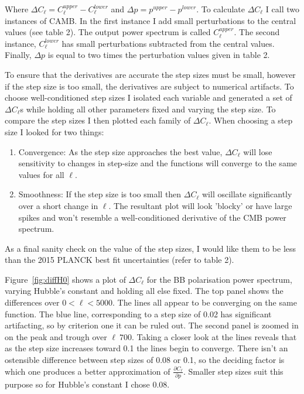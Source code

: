 Where $\Delta C_{\ell} = C^{upper}_{\ell} - C^{lower}_{\ell}$ and $\Delta p = p^{upper} - p^{lower}$. To calculate $\Delta C_{\ell}$ I call two instances of CAMB. In the first instance I add small perturbations to the central values (see table 2). The output power spectrum is called $C^{upper}_{\ell}$. The second instance, $C^{lower}_{\ell}$ has small perturbations subtracted from the central values. Finally, $\Delta p$ is equal to two times the perturbation values given in table 2.

To ensure that the derivatives are accurate the step sizes must be small, however if the step size is too small, the derivatives are subject to numerical artifacts. To choose well-conditioned step sizes I isolated each variable and generated a set of $\Delta C_{\ell}$s while holding all other parameters fixed and varying the step size. To compare the step sizes I then plotted each family of $\Delta C_{\ell}$. When choosing a step size I looked for two things:

\begin{enumerate}
\item Convergence: As the step size approaches the best value, $\Delta C_{\ell}$ will lose sensitivity to changes in step-size and the functions will converge to the same values for all $\ell$.

\item Smoothness: If the step size is too small then $\Delta C_{\ell}$ will oscillate significantly over a short change in $\ell$. The resultant plot will look 'blocky' or have large spikes and won't resemble a well-conditioned derivative of the CMB power spectrum.
\end{enumerate}

As a final sanity check on the value of the step sizes, I would like them to be less than the 2015 PLANCK best fit uncertainties (refer to table 2).
 
Figure~\ref{fig:diffH0} shows a plot of $\Delta C_{\ell}$ for the BB polarisation power spectrum, varying Hubble's constant and holding all else fixed. The top panel shows the differences over $ 0 < \ell < 5000$. The lines all appear to be converging on the same function. The blue line, corresponding to a step size of 0.02 has significant artifacting, so by criterion one it can be ruled out. The second panel is zoomed in on the peak and trough over $\ell ~ 700$. Taking a closer look at the lines reveals that as the step size increases toward 0.1 the lines begin to converge. There isn't an ostensible difference between step sizes of 0.08 or 0.1, so the deciding factor is which one produces a better approximation of $\frac{\partial C_{\ell}}{\partial p}$. Smaller step sizes suit this purpose so for Hubble's constant I chose 0.08.
  
